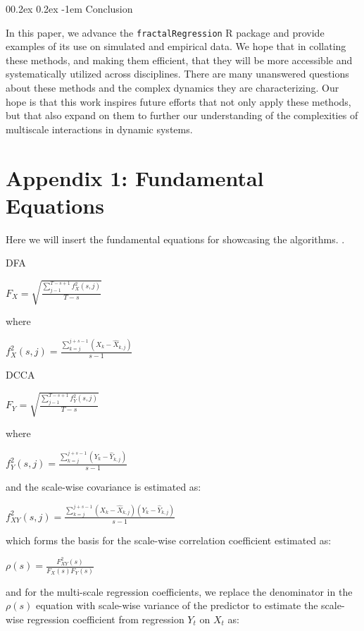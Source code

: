 \documentclass[
  man]{apa6}
\makeatletter
\let\oldparagraph\paragraph
\renewcommand{\paragraph}[1]{\oldparagraph{#1}\mbox{}}
\renewcommand{\paragraph}{\@startsection{paragraph}{4}{\parindent}%
  {0\baselineskip \@plus 0.2ex \@minus 0.2ex}%
  {-1em}%
  {\normalfont\normalsize\bfseries\itshape\typesectitle}}
\makeatother
\begin{document}
\hypertarget{conclusion}{%
\paragraph{Conclusion}\label{conclusion}}

In this paper, we advance the \texttt{fractalRegression} R package and provide
examples of its use on simulated and empirical data. We hope that in
collating these methods, and making them efficient, that they will be
more accessible and systematically utilized across disciplines. There
are many unanswered questions about these methods and the complex
dynamics they are characterizing. Our hope is that this work inspires
future efforts that not only apply these methods, but that also expand
on them to further our understanding of the complexities of multiscale
interactions in dynamic systems.

\hypertarget{appendix-1-fundamental-equations}{%
\section{Appendix 1: Fundamental Equations}\label{appendix-1-fundamental-equations}}

Here we will insert the fundamental equations for showcasing the
algorithms. .

DFA

\(F_X = \sqrt{\frac{\sum^{T-s+1}_{j-1}f^2_X(s,j)}{T-s}}\)

where

\(f^2_X(s,j) = \frac{\sum^{j+s-1}_{k=j}(X_k -\widehat{X}_{k,j})}{s-1}\)

DCCA

\(F_Y = \sqrt{\frac{\sum^{T-s+1}_{j-1}f^2_Y(s,j)}{T-s}}\)

where

\(f^2_Y(s,j) = \frac{\sum^{j+s-1}_{k=j}(Y_k -\widehat{Y}_{k,j})}{s-1}\)

and the scale-wise covariance is estimated as:

\(f^2_{XY}(s,j) = \frac{\sum^{j+s-1}_{k=j}(X_k -\widehat{X}_{k,j})(Y_k -\widehat{Y}_{k,j})}{s-1}\)

which forms the basis for the scale-wise correlation coefficient
estimated as:

\(\rho(s) = \frac{F^2_{XY}(s)}{F_X(s)F_Y(s)}\)

and for the multi-scale regression coefficients, we replace the
denominator in the \(\rho(s)\) equation with scale-wise variance of the
predictor to estimate the scale-wise regression coefficient from
regression \(Y_t\) on \(X_t\) as:
\end{document}
